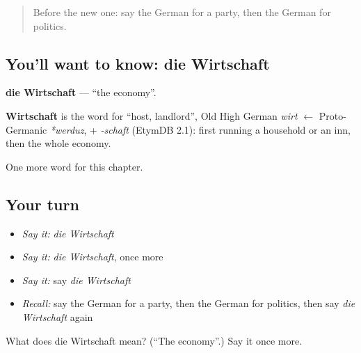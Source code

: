 \begin{quote}
Before the new one: say the German for a party, then the German for politics.
\end{quote}

\subsection*{You'll want to know: die Wirtschaft}
\textbf{die Wirtschaft} — \textquotedblleft{}the economy\textquotedblright{}.

\begin{cousinweb}
\textbf{Wirtschaft} is the word for \textquotedblleft{}host, landlord\textquotedblright{}, Old High German \emph{wirt} $\leftarrow$ Proto-Germanic \emph{*werduz}, + \emph{-schaft} (EtymDB 2.1): first running a household or an inn, then the whole economy.
\end{cousinweb}

\begin{grammarlens}[title={What you've built}]
One more word for this chapter.
\end{grammarlens}

\subsection*{Your turn}
\begin{itemize}
\raggedright
  \item \emph{Say it:} \emph{die Wirtschaft}
  \item \emph{Say it:} \emph{die Wirtschaft}, once more
  \item \emph{Say it:} say \emph{die Wirtschaft}
  \item \emph{Recall:} say the German for a party, then the German for politics, then say \emph{die Wirtschaft} again
\end{itemize}

\begin{tcolorbox}[breakable,colback=teal!4,colframe=teal!35!black,title={Before you move on}]
What does die Wirtschaft mean? (\textquotedblleft{}The economy\textquotedblright{}.) Say it once more.
\end{tcolorbox}
